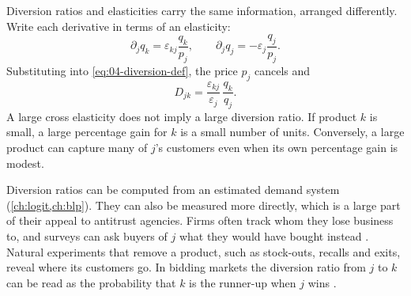 Diversion ratios and elasticities carry the same information, arranged differently. Write each derivative
in terms of an elasticity:
\[
  \partial_j q_k = \varepsilon_{kj}\frac{q_k}{p_j}, \qquad \partial_j q_j = -\varepsilon_j\frac{q_j}{p_j}.
\]
Substituting into \eqref{eq:04-diversion-def}, the price $p_j$ cancels and
\begin{equation}\label{eq:04-diversion-elast}
  D_{jk} = \frac{\varepsilon_{kj}}{\varepsilon_j}\,\frac{q_k}{q_j}.
\end{equation}
A large cross elasticity does not imply a large diversion ratio. If product $k$ is small, a large percentage
gain for $k$ is a small number of units. Conversely, a large product can capture many of $j$'s customers even
when its own percentage gain is modest.

Diversion ratios can be computed from an estimated demand system (\cref{ch:logit,ch:blp}). They can also be
measured more directly, which is a large part of their appeal to antitrust agencies. Firms often track whom
they lose business to, and surveys can ask buyers of $j$ what they would have bought instead
\citep[p.~16]{FarrellShapiro2010}. Natural experiments that remove a product, such as stock-outs, recalls and
exits, reveal where its customers go. In bidding markets the diversion ratio from $j$ to $k$ can be read as
the probability that $k$ is the runner-up when $j$ wins \citep[p.~16]{FarrellShapiro2010}.


